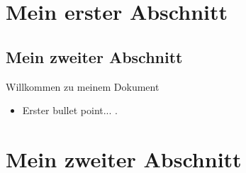 \documentclass{article}
\begin{document}
	
	\section{Mein erster Abschnitt}
	\subsection{Mein zweiter Abschnitt}
	
	Willkommen zu meinem Dokument
	\begin{itemize}
		\item Erster bullet point... \cite{ts101}.
	\end{itemize}
	
	\section{Mein zweiter Abschnitt}
	\printbibliography[
	heading=bibintoc,
	title={Bibliography}
	]	
\end{document}
